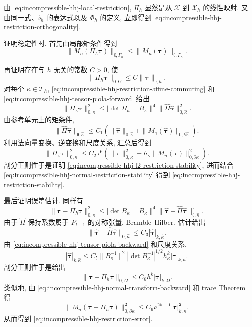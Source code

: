\begin{Proof}
由 \eqref{eq:incompressible-hhj-local-restriction},
$\Pi_h$ 显然是从 $\mathcal X$ 到 $\mathcal X_h$ 的线性映射.
又由同一式、$b_h$ 的表达式以及 $\Phi_h$ 的定义,
立即得到
\eqref{eq:incompressible-hhj-restriction-orthogonality}.

证明稳定性时, 首先由局部矩条件得到
\begin{equation}\label{eq:incompressible-hhj-normal-restriction-stability}
\|M_n(\Pi_h\boldsymbol\tau)\|_{0,\Gamma_h}
\leq\|M_n(\boldsymbol\tau)\|_{0,\Gamma_h}.
\end{equation}

再证明存在与 $h$ 无关的常数 $C>0$, 使
\begin{equation}\label{eq:incompressible-hhj-l2-restriction-stability}
\|\Pi_h\boldsymbol\tau\|_{0,\Omega}
\leq C\|\boldsymbol\tau\|_{0,h}.
\end{equation}
对每个 $\kappa\in\mathcal T_h$,
\eqref{eq:incompressible-hhj-restriction-affine-commuting}
和 \eqref{eq:incompressible-hhj-tensor-piola-forward} 给出
\[
\|\Pi_\kappa\boldsymbol\tau\|_{0,\kappa}^2
\leq|\det B_\kappa|\|B_\kappa\|^4
\|\widehat\Pi\widehat{\boldsymbol\tau}\|_{0,\widehat\kappa}^2.
\]
由参考单元上的矩条件,
\[
\|\widehat\Pi\widehat{\boldsymbol\tau}\|_{0,\widehat\kappa}
\leq C_1\left(
\|\widehat{\boldsymbol\tau}\|_{0,\widehat\kappa}
+\|M_{\widehat n}(\widehat{\boldsymbol\tau})\|_{0,\partial\widehat\kappa}
\right).
\]
利用法向量变换、逆变换和尺度关系, 汇总后得到
\[
\|\Pi_\kappa\boldsymbol\tau\|_{0,\kappa}^2
\leq C_2\sigma^6\left(
\|\boldsymbol\tau\|_{0,\kappa}^2
+h_\kappa\|M_n(\boldsymbol\tau)\|_{0,\partial\kappa}^2
\right).
\]
剖分正则性于是证明
\eqref{eq:incompressible-hhj-l2-restriction-stability},
进而结合
\eqref{eq:incompressible-hhj-normal-restriction-stability}
得到 \eqref{eq:incompressible-hhj-restriction-stability}.

最后证明误差估计.
同样有
\[
\|\boldsymbol\tau-\Pi_h\boldsymbol\tau\|_{0,\kappa}^2
\leq|\det B_\kappa|\|B_\kappa\|^4
\|\widehat{\boldsymbol\tau}
-\widehat\Pi\widehat{\boldsymbol\tau}\|_{0,\widehat\kappa}^2.
\]
由于 $\widehat\Pi$ 保持系数属于 $P_{l-1}$ 的对称张量,
Bramble--Hilbert 估计给出
\[
\|\widehat{\boldsymbol\tau}
-\widehat\Pi\widehat{\boldsymbol\tau}\|_{0,\widehat\kappa}
\leq C_3|\widehat{\boldsymbol\tau}|_{k,\widehat\kappa}.
\]
由 \eqref{eq:incompressible-hhj-tensor-piola-backward}
和尺度关系,
\[
|\widehat{\boldsymbol\tau}|_{k,\widehat\kappa}
\leq C_5\|B_\kappa^{-1}\|^2
|\det B_\kappa^{-1}|^{1/2}
h_\kappa^k|\boldsymbol\tau|_{k,\kappa}.
\]
剖分正则性于是给出
\[
\|\boldsymbol\tau-\Pi_h\boldsymbol\tau\|_{0,\Omega}
\leq C_6h^k|\boldsymbol\tau|_{k,\Omega}.
\]
类似地, 由
\eqref{eq:incompressible-hhj-normal-transform-backward}
和 trace Theorem 得
\[
\|M_n(\boldsymbol\tau-\Pi_h\boldsymbol\tau)\|_{0,\partial\kappa}^2
\leq C_9h^{2k-1}|\boldsymbol\tau|_{k,\kappa}^2.
\]
从而得到
\eqref{eq:incompressible-hhj-restriction-error}.
\end{Proof}
